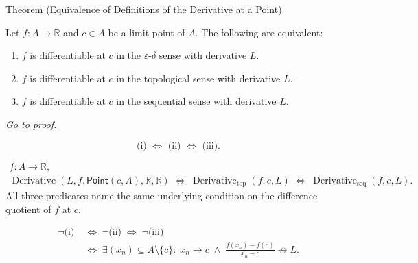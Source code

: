 \begin{theorembox}{Theorem (Equivalence of Definitions of the Derivative at a Point)}
\begin{theorem}
\label{thm:derivative-equivalence}
Let $f : A \to \mathbb{R}$ and $c \in A$ be a limit point of $A$. The following are equivalent:
\begin{enumerate}
  \item $f$ is differentiable at $c$ in the $\varepsilon$-$\delta$ sense with derivative $L$.
  \item $f$ is differentiable at $c$ in the topological sense with derivative $L$.
  \item $f$ is differentiable at $c$ in the sequential sense with derivative $L$.
\end{enumerate}

\smallskip\noindent
\hyperref[prf:derivative-equivalence]{\textit{Go to proof.}}
\end{theorem}
\end{theorembox}

\begin{remark*}
\[
\text{(i) } \Longleftrightarrow \text{ (ii) } \Longleftrightarrow \text{ (iii).}
\]
\end{remark*}

\begin{remark*}
\[
\begin{aligned}
  f\colon A\to\mathbb{R},\\
\operatorname{Derivative}(L,f,\mathsf{Point}(c,A),\mathbb R,\mathbb R)
\;\Longleftrightarrow\;
\operatorname{Derivative}_{\mathrm{top}}(f,c,L)
\;\Longleftrightarrow\;
\operatorname{Derivative}_{\mathrm{seq}}(f,c,L).
\end{aligned}
\]
All three predicates name the same underlying condition on the difference quotient of $f$ at $c$.
\end{remark*}

\begin{remark*}
\[
\begin{aligned}
\neg\text{(i)} &\;\Longleftrightarrow\; \neg\text{(ii)} \;\Longleftrightarrow\; \neg\text{(iii)}\\
&\;\Longleftrightarrow\; \exists (x_n) \subseteq A \setminus \{c\}:\;
x_n \to c \;\land\; \frac{f(x_n)-f(c)}{x_n-c} \not\to L.
\end{aligned}
\]
\end{remark*}

